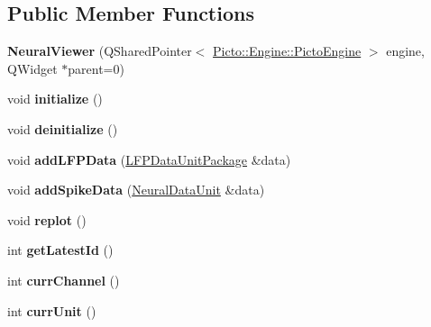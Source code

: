 \subsection*{Public Member Functions}
\begin{DoxyCompactItemize}
\item 
\hypertarget{class_neural_viewer_ac32bf59fec059969dc25620324a7febf}{{\bfseries Neural\-Viewer} (Q\-Shared\-Pointer$<$ \hyperlink{class_picto_1_1_engine_1_1_picto_engine}{Picto\-::\-Engine\-::\-Picto\-Engine} $>$ engine, Q\-Widget $\ast$parent=0)}\label{class_neural_viewer_ac32bf59fec059969dc25620324a7febf}

\item 
\hypertarget{class_neural_viewer_af77c5ebe37e74c7d1e6374745cab8420}{void {\bfseries initialize} ()}\label{class_neural_viewer_af77c5ebe37e74c7d1e6374745cab8420}

\item 
\hypertarget{class_neural_viewer_a3217872423398e414a84def5879bcd86}{void {\bfseries deinitialize} ()}\label{class_neural_viewer_a3217872423398e414a84def5879bcd86}

\item 
\hypertarget{class_neural_viewer_a45efe91962fbf6f11885e1af49f49dd5}{void {\bfseries add\-L\-F\-P\-Data} (\hyperlink{class_picto_1_1_l_f_p_data_unit_package}{L\-F\-P\-Data\-Unit\-Package} \&data)}\label{class_neural_viewer_a45efe91962fbf6f11885e1af49f49dd5}

\item 
\hypertarget{class_neural_viewer_ab08e20445a8c1251a21b6e73bcca2185}{void {\bfseries add\-Spike\-Data} (\hyperlink{class_picto_1_1_neural_data_unit}{Neural\-Data\-Unit} \&data)}\label{class_neural_viewer_ab08e20445a8c1251a21b6e73bcca2185}

\item 
\hypertarget{class_neural_viewer_ab87f3c4f07d548207cbe7ec65ffbebe0}{void {\bfseries replot} ()}\label{class_neural_viewer_ab87f3c4f07d548207cbe7ec65ffbebe0}

\item 
\hypertarget{class_neural_viewer_aec6166d6965a8642e01f6835058c46c1}{int {\bfseries get\-Latest\-Id} ()}\label{class_neural_viewer_aec6166d6965a8642e01f6835058c46c1}

\item 
\hypertarget{class_neural_viewer_a389a58790d8355cecb897992da62062e}{int {\bfseries curr\-Channel} ()}\label{class_neural_viewer_a389a58790d8355cecb897992da62062e}

\item 
\hypertarget{class_neural_viewer_aae7df042c00df888a48124ed07d713c4}{int {\bfseries curr\-Unit} ()}\label{class_neural_viewer_aae7df042c00df888a48124ed07d713c4}

\end{DoxyCompactItemize}


